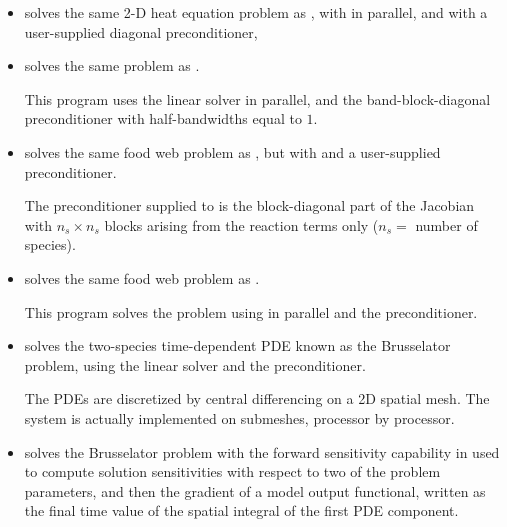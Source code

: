 \begin{itemize}


\item {}
  solves the same 2-D heat equation problem as , with {\sunlinsolspgmr}
  in parallel, and with a user-supplied diagonal preconditioner,
  
\item {}
  solves the same problem as .

  This program uses the {\sunlinsolspgmr} linear solver in parallel,
  and the band-block-diagonal preconditioner {\idabbdpre} with half-bandwidths 
  equal to $1$.

\item {}
  solves the same food web problem as , but with {\sunlinsolspgmr}
  and a user-supplied preconditioner.
  
  The preconditioner supplied to {\sunlinsolspgmr} is the block-diagonal part of 
  the Jacobian with $n_s \times n_s$ blocks arising from the reaction terms only
  ($n_s =$ number of species).

\item {}
  solves the same food web problem as .

  This program solves the problem using {\sunlinsolspgmr} in parallel and the
  {\idabbdpre} preconditioner.

\item {}
  solves the two-species time-dependent PDE known as the Brusselator problem,
  using the {\sunlinsolspgmr} linear solver and the {\idabbdpre} preconditioner.

  The PDEs are discretized by central differencing on a 2D spatial mesh.
  The system is actually implemented on submeshes, processor by processor.


\item {}
  solves the Brusselator problem with the forward sensitivity capability in {\idas}
  used to compute solution sensitivities with respect to two of the problem 
  parameters, and then the gradient of a model output functional, written as
  the final time value of the spatial integral of the first PDE component.


\end{itemize}
